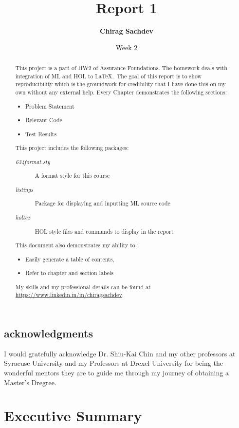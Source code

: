\documentclass{report}
\title{Report 1}
\author{\textbf{Chirag Sachdev}}
\date{Week 2}
\begin{document}
\lstset{language=ML}
\maketitle{}

\begin{abstract}
This project is a part of HW2 of Assurance Foundations. The homework deals with integration of ML and HOL to \LaTeX.\ The goal of this report is to show reproducibility which is the groundwork for credibility that I have done this on my own without any external help. Every Chapter demonstrates the following sections:
	\begin{itemize}
		\item Problem Statement
		\item Relevant Code
		\item Test Results
	\end{itemize}
	
This project includes the following packages:
	\begin{description}
		\item[\emph{634format.sty}] A format style for this course
		\item[\emph{listings}] Package for displaying and inputting ML source code
		\item[\emph{holtex}] HOL style files and commands to display in the report
	\end{description}

This document also demonstrates my ability to :
	\begin{itemize}
		\item Easily generate a table of contents,
		\item Refer to chapter and section labels
	\end{itemize}

My skills and my professional details can be found at \url{https://www.linkedin.in/in/chiragsachdev}.
\end{abstract}

\section*{acknowledgments}
I would gratefully acknowledge Dr. Shiu-Kai Chin and my other professors at Syracuse University and my Professors at Drexel University for being the wonderful mentors they are to guide me through my journey of obtaining a Master's Dregree.

\tableofcontents{}

\chapter{Executive Summary}
\label{cha:executive-summary}
\end{document}
